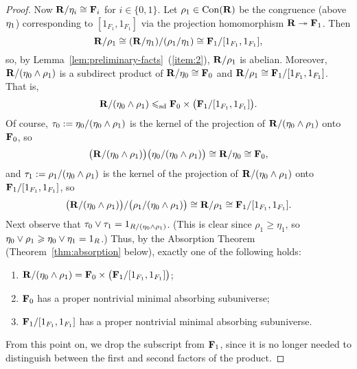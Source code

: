 \begin{proof}
Now $\mathbf{R}/\eta_i \cong \mathbf{F}_i$ for $i \in \{0,1\}$.
Let $\rho_1 \in \operatorname{Con}(\mathbf{R})$ be the congruence
(above $\eta_1$) corresponding to $[1_{F_1}, 1_{F_1}]$ via the projection
homomorphism $\mathbf{R} \twoheadrightarrow \mathbf{F}_1$.  Then
\[
\mathbf{R}/\rho_1 \cong (\mathbf{R}/\eta_1)/(\rho_1/\eta_1) \cong \mathbf{F}_1/[1_{F_1}, 1_{F_1}],
\]
so, by Lemma~\ref{lem:preliminary-facts}~(\ref{item:2}),
$\mathbf{R}/\rho_1$ is abelian.  Moreover, $\mathbf{R}/(\eta_0\wedge \rho_1)$ is a subdirect
product of $\mathbf{R}/\eta_0 \cong \mathbf{F}_0$ and  
$\mathbf{R}/\rho_1 \cong \mathbf{F}_1/[1_{F_1}, 1_{F_1}]$.  That is,
\[
\mathbf{R}/(\eta_0\wedge \rho_1) \leqslant_{\mathrm{sd}} \mathbf{F}_0\times 
\bigl(\mathbf{F}_1/[1_{F_1}, 1_{F_1}]\bigr).
\]
Of course, $\tau_0 := \eta_0/(\eta_0\wedge \rho_1)$ is the kernel of the
projection of $\mathbf{R}/(\eta_0\wedge \rho_1)$ onto $\mathbf{F}_0$, so
\[
\bigl(\mathbf{R}/(\eta_0\wedge \rho_1)\bigr)\bigl(\eta_0/(\eta_0\wedge \rho_1)\bigr)
\cong \mathbf{R}/\eta_0 \cong \mathbf{F}_0,
\]
and $\tau_1 := \rho_1/(\eta_0\wedge \rho_1)$ is the kernel of the
projection of $\mathbf{R}/(\eta_0\wedge \rho_1)$ onto $\mathbf{F}_1/[1_{F_1},1_{F_1}]$, so
\[
\bigl(\mathbf{R}/(\eta_0\wedge \rho_1)\bigr)/\bigl(\rho_1/(\eta_0\wedge \rho_1)\bigr)
\cong \mathbf{R}/\rho_1 \cong \mathbf{F}_1/[1_{F_1},1_{F_1}].
\]
Next observe that
$\tau_0\vee \tau_1 = 1_{R/(\eta_0\wedge \rho_1)}$. (This is clear since
$\rho_1\geq \eta_1$, so  $\eta_0 \vee \rho_1 \geqslant \eta_0 \vee \eta_1 = 1_R$.)
Thus, by the Absorption Theorem (Theorem~\ref{thm:absorption} below),
exactly one of the following holds:
\begin{enumerate}
\item \label{item:6} $\mathbf{R}/(\eta_0\wedge \rho_1) =\mathbf{F}_0 \times \bigl(\mathbf{F}_1/[1_{F_1}, 1_{F_1}]\bigr)$;
\item \label{item:7} $\mathbf{F}_0$ has a proper nontrivial minimal absorbing subuniverse;
\item \label{item:8} $\mathbf{F}_1/[1_{F_1}, 1_{F_1}]$ has a proper
  nontrivial minimal absorbing subuniverse.
\end{enumerate}

From this point on, we drop the subscript from $\mathbf{F}_1$, since it is no longer
needed to distinguish between the first and second factors of the product.

\newcommand{\Fone}{\ensuremath{F}}
\newcommand{\bFone}{\ensuremath{\mathbf{F}}}


\end{proof}
